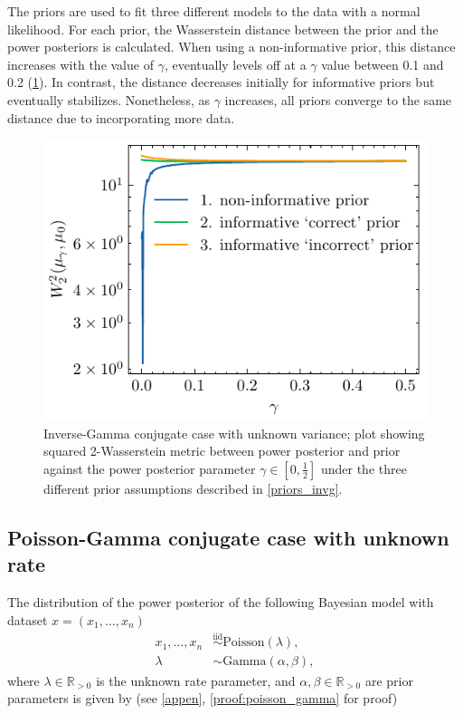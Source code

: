 \documentclass[12pt]{article}
\begin{document}
The priors are used to fit three different models to the data with a normal likelihood. For each prior, the Wasserstein distance between the prior and the power posteriors is calculated. When using a non-informative prior, this distance increases with the value of $\gamma$, eventually levels off  at a $\gamma$ value between 0.1 and 0.2 (\cref{fig:ing_conju}). In contrast, the distance decreases initially for informative priors but eventually stabilizes. Nonetheless, as $\gamma$ increases, all priors converge to the same distance due to incorporating more data.

\FloatBarrier
\begin{figure}
\begin{center}
        \includegraphics{imgs/inv_gamma_wasserstein_distance.pdf}     
\end{center}
        \caption{Inverse-Gamma conjugate case with unknown variance; plot showing squared
2-Wasserstein metric between power posterior and prior against the
power posterior parameter $\gamma \in [0, \frac{1}{2}]$ under the three
different prior assumptions described in  \cref{priors_invg}.}
    \label{fig:ing_conju}
\end{figure}

\subsection{Poisson-Gamma conjugate case with unknown rate}

The distribution of the power posterior of the following Bayesian model with
dataset $x = (x_1, \ldots, x_n)$ 
\begin{subequations}
\begin{align}
x_1, \ldots, x_n &\overset{\mathrm{iid}}{\sim} \text{Poisson}(\lambda), \\
\lambda &\sim \text{Gamma}(\alpha, \beta),
\end{align}
\end{subequations}
where $\lambda \in \mathbb{R}_{>0}$ is the unknown rate parameter, and $\alpha,
\beta \in \mathbb{R}_{>0}$ are prior parameters is given by (see \cref{appen}, \cref{proof:poisson_gamma} for proof)
\end{document}
